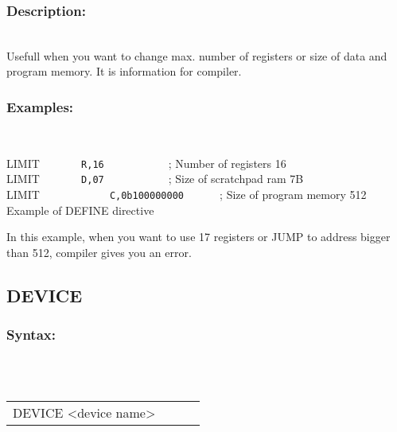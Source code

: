         \subsubsection{Description:}\\
        Usefull when you want to change max. number of registers or size of  data and program memory. It is information for compiler.\\

        \subsubsection{Examples:}\\
                        \begin{code}[h!]
                        { \color{highlight_directive} LIMIT }   \verb`     `
                        { \color{highlight_symbol}\verb' R,16' }  \verb`          `   { \color{highlight_comment} ; Number of registers 16 }\\
                        { \color{highlight_directive} LIMIT }   \verb`     `
                        { \color{highlight_symbol}\verb' D,07' }  \verb`          `   { \color{highlight_comment} ; Size of scratchpad ram 7B }\\
                        { \color{highlight_directive} LIMIT }   \verb`          `
                        { \color{highlight_symbol}\verb' C,0b100000000' }  \verb`     `   { \color{highlight_comment} ; Size of program memory 512}\\
                        \caption{Example of DEFINE directive}
                        \end{code}
        In this example, when you want to use 17 registers or JUMP to address bigger than 512, compiler gives you an error.

        \subsection{DEVICE}
        \subsubsection{Syntax:}\\
        \\ {
            \texttt{}
            \begin{tabular}[h!]{llll}
                    { \color{highlight_directive} DEVICE } { \color{highlight_symbol} <device name> }
                    { \color{highlight_comment}  }\\
            \end{tabular}
            }\\
            \\
